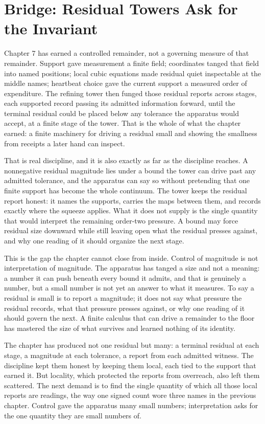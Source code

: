 \section*{Bridge: Residual Towers Ask for the Invariant}

Chapter 7 has earned a controlled remainder, not a governing measure of that remainder. Support gave measurement a finite field; coordinates tanged that field into named positions; local cubic equations made residual quiet inspectable at the middle names; heartbeat choice gave the current support a measured order of expenditure. The refining tower then funged those residual reports across stages, each supported record passing its admitted information forward, until the terminal residual could be placed below any tolerance the apparatus would accept, at a finite stage of the tower. That is the whole of what the chapter earned: a finite machinery for driving a residual small and showing the smallness from receipts a later hand can inspect.

That is real discipline, and it is also exactly as far as the discipline reaches. A nonnegative residual magnitude lies under a bound the tower can drive past any admitted tolerance, and the apparatus can say so without pretending that one finite support has become the whole continuum. The tower keeps the residual report honest: it names the supports, carries the maps between them, and records exactly where the squeeze applies. What it does not supply is the single quantity that would interpret the remaining order-two pressure. A bound may force residual size downward while still leaving open what the residual presses against, and why one reading of it should organize the next stage.

This is the gap the chapter cannot close from inside. Control of magnitude is not interpretation of magnitude. The apparatus has tanged a size and not a meaning: a number it can push beneath every bound it admits, and that is genuinely a number, but a small number is not yet an answer to what it measures. To say a residual is small is to report a magnitude; it does not say what pressure the residual records, what that pressure presses against, or why one reading of it should govern the next. A finite calculus that can drive a remainder to the floor has mastered the size of what survives and learned nothing of its identity.

The chapter has produced not one residual but many: a terminal residual at each stage, a magnitude at each tolerance, a report from each admitted witness. The discipline kept them honest by keeping them local, each tied to the support that earned it. But locality, which protected the reports from overreach, also left them scattered. The next demand is to find the single quantity of which all those local reports are readings, the way one signed count wore three names in the previous chapter. Control gave the apparatus many small numbers; interpretation asks for the one quantity they are small numbers of.

